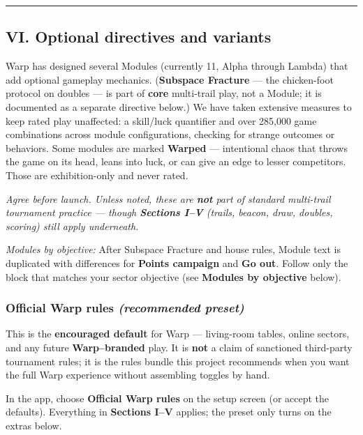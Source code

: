 \documentclass[11pt]{article}
\begin{document}
\begin{center}\rule{0.5\linewidth}{0.5pt}\end{center}

\subsection{VI. Optional directives and
variants}\label{vi-optional-directives-and-variants}

Warp has designed several Modules (currently 11, Alpha through Lambda)
that add optional gameplay mechanics. (\textbf{Subspace Fracture} --- the
chicken-foot protocol on doubles --- is part of \textbf{core} multi-trail
play, not a Module; it is documented as a separate directive below.) We
have taken extensive measures
to keep rated play unaffected: a skill/luck quantifier and over
285,000 game combinations across module configurations, checking for
strange outcomes or behaviors. Some modules are marked
\textbf{Warped} --- intentional chaos that throws the game on its
head, leans into luck, or can give an edge to lesser competitors.
Those are exhibition-only and never rated.

\medskip

\emph{Agree before launch. Unless noted, these are \textbf{not} part of
standard multi-trail tournament practice --- though \textbf{Sections
I--V} (trails, beacon, draw, doubles, scoring) still apply underneath.}

\emph{Modules by objective:} After Subspace Fracture and house rules,
Module text is duplicated with differences for \textbf{Points campaign} and
\textbf{Go out}. Follow only the block that matches your sector
objective (see \textbf{Modules by objective} below).

\subsubsection{\texorpdfstring{Official Warp rules \emph{(recommended
preset)}}{Official Warp rules (recommended preset)}}\label{official-warp-rules-recommended-preset}

This is the \textbf{encouraged default} for Warp --- living-room tables,
online sectors, and any future \textbf{Warp--branded} play. It is
\textbf{not} a claim of sanctioned third-party tournament rules; it is
the rules bundle this project recommends when you want the full Warp
experience without assembling toggles by hand.

In the app, choose \textbf{Official Warp rules} on the setup screen (or
accept the defaults). Everything in \textbf{Sections I--V} applies; the
preset only turns on the extras below.
\end{document}
